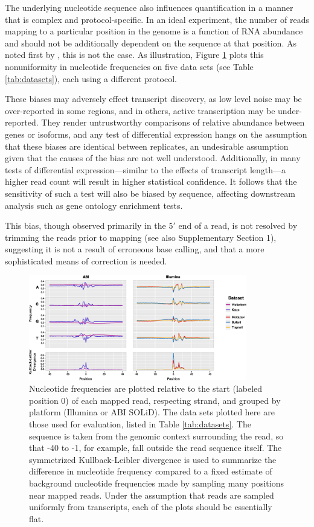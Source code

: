 \documentclass{bioinfo}
\begin{document}
The underlying nucleotide sequence also influences quantification in a manner
that is complex and protocol-specific. In an ideal experiment, the number of
reads mapping to a particular position in the genome is a function of RNA
abundance and should not be additionally dependent on the sequence at that
position. As noted first by \citet{Dohm2008}, this is not the case.  As
illustration, Figure \ref{fig:freqs} plots this nonuniformity in nucleotide
frequencies on five data sets (see Table \ref{tab:datasets}), each using a
different protocol.


These biases may adversely effect transcript discovery, as low level noise may
be over-reported in some regions, and in others, active transcription may be
under-reported. They render untrustworthy comparisons of relative abundance
between genes or isoforms, and any test of differential expression hangs on the
assumption that these biases are identical between replicates, an undesirable
assumption given that the causes of the bias are not well understood.
Additionally, in many tests of differential expression---similar to the effects
of transcript length---a higher read count will result in higher statistical
confidence. It follows that the sensitivity of such a test will also be biased
by sequence, affecting downstream analysis such as gene ontology enrichment
tests.

This bias, though observed primarily in the $5'$ end of a read, is not resolved by
trimming the reads prior to mapping \citep{Hansen2010} (see also Supplementary
Section 1), suggesting it is not a result of erroneous base calling, and that a
more sophisticated means of correction is needed.

\begin{figure}
\centerline{\includegraphics[width=0.85\textwidth]{freqs.eps}}
\caption{Nucleotide frequencies are plotted relative to the start (labeled
position 0) of each mapped read, respecting strand, and grouped by platform
(Illumina or ABI SOLiD).  The data sets plotted here are those used
for evaluation, listed in Table \ref{tab:datasets}.
The sequence is taken from the genomic context surrounding the read, so that -40
to -1, for example, fall outside the read sequence itself. The symmetrized
Kullback-Leibler divergence is used to summarize the difference in nucleotide
frequency compared to a fixed estimate of background nucleotide frequencies made
by sampling many positions near mapped reads.  Under the assumption that reads
are sampled uniformly from transcripts, each of the plots should be essentially
flat.}
\label{fig:freqs}
\end{figure}
\end{document}

